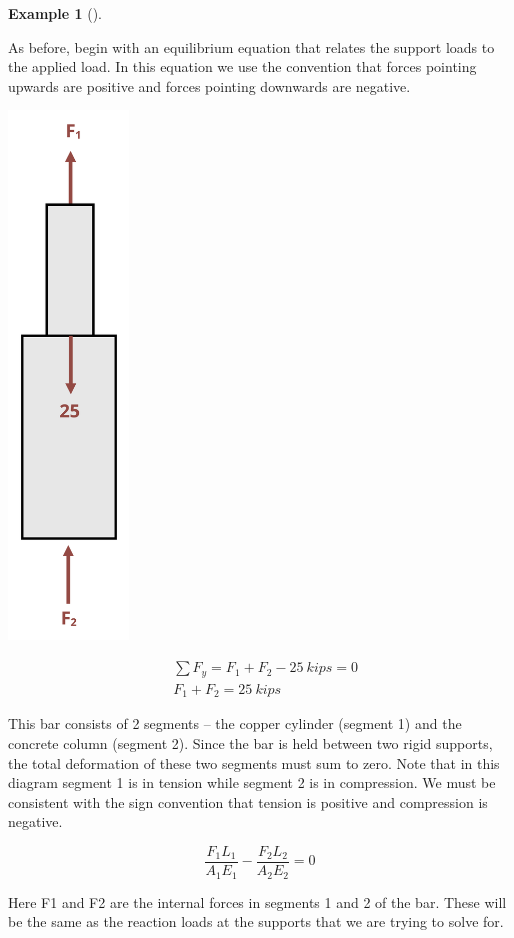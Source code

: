 \documentclass[
  letterpaper,
  DIV=11,
  numbers=noendperiod]{scrreprt}
\theoremstyle{definition}
\newtheorem{example}{Example}[chapter]
\theoremstyle{remark}
\begin{document}
\begin{tcolorbox}
\begin{example}[]
\begin{tcolorbox}
As before, begin with an equilibrium equation that relates the support
loads to the applied load. In this equation we use the convention that
forces pointing upwards are positive and forces pointing downwards are
negative.

\begin{center}
\includegraphics[width=1.26042in,height=\textheight]{images/PNGs/Example 5.6 part 2.png}
\end{center}

\[
\begin{aligned}
& \sum F_y=F_1+F_2-25{~kips}=0 \\
& F_1+F_2=25{~kips}
\end{aligned}
\]

This bar consists of 2 segments -- the copper cylinder (segment 1) and
the concrete column (segment 2). Since the bar is held between two rigid
supports, the total deformation of these two segments must sum to zero.
Note that in this diagram segment 1 is in tension while segment 2 is in
compression. We must be consistent with the sign convention that tension
is positive and compression is negative.

\[
\frac{F_1 L_1}{A_1 E_1}-\frac{F_2 L_2}{A_2 E_2}=0
\]

Here F1 and F2 are the internal forces in segments 1 and 2 of the bar.
These will be the same as the reaction loads at the supports that we are
trying to solve for.


\end{tcolorbox}
\end{example}
\end{tcolorbox}
\end{document}
